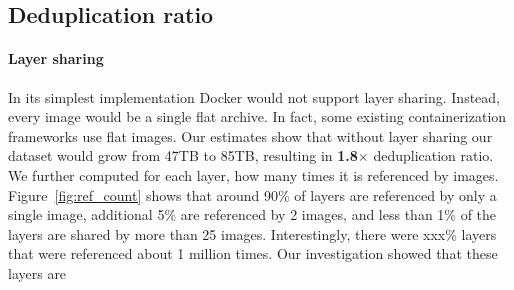 \subsection{Deduplication ratio} 
\label{sec:dedup_ratio}

%
%
%

\paragraph{Layer sharing}

%

In its simplest implementation Docker would not support layer sharing.
%
Instead, every image would be a single flat archive.
%
In fact, some existing containerization frameworks  use flat images.
%
Our estimates show that without layer sharing our dataset would grow from 47TB
to 85TB, resulting in \textbf{1.8$\times$} deduplication ratio.
% 
We further computed for each layer, how many times it is referenced by images.
%
Figure~\ref{fig:ref_count} shows that around 90\% of layers are referenced by
only a single image, additional 5\% are referenced by 2 images, and less than
1\% of the layers are shared by more than 25 images.
%
%
%
%
%
%
%
Interestingly, there were xxx\% layers that were referenced about 1 million
times.
%
Our investigation showed  that these layers are~

